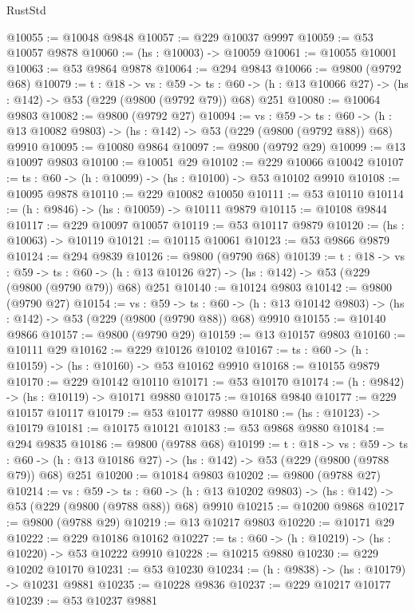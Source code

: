 \begin{lexlean}{RustStd}
\begin{coremodule}
@10055 := @10048 @9848
@10057 := @229 @10037 @9997
@10059 := @53 @10057 @9878
@10060 := (hs : @10003) -> @10059
@10061 := @10055 @10001
@10063 := @53 @9864 @9878
@10064 := @294 @9843
@10066 := @9800 (@9792 @68)
@10079 := {t : @18} ->
  {vs : @59} ->
  {ts : @60} -> (h : @13 @10066 @27) -> (hs : @142) -> @53 (@229 (@9800 (@9792 @79)) @68) @251
@10080 := @10064 @9803
@10082 := @9800 (@9792 @27)
@10094 := {vs : @59} ->
  {ts : @60} -> (h : @13 @10082 @9803) -> (hs : @142) -> @53 (@229 (@9800 (@9792 @88)) @68) @9910
@10095 := @10080 @9864
@10097 := @9800 (@9792 @29)
@10099 := @13 @10097 @9803
@10100 := @10051 @29
@10102 := @229 @10066 @10042
@10107 := {ts : @60} -> (h : @10099) -> (hs : @10100) -> @53 @10102 @9910
@10108 := @10095 @9878
@10110 := @229 @10082 @10050
@10111 := @53 @10110
@10114 := (h : @9846) -> (hs : @10059) -> @10111 @9879
@10115 := @10108 @9844
@10117 := @229 @10097 @10057
@10119 := @53 @10117 @9879
@10120 := (hs : @10063) -> @10119
@10121 := @10115 @10061
@10123 := @53 @9866 @9879
@10124 := @294 @9839
@10126 := @9800 (@9790 @68)
@10139 := {t : @18} ->
  {vs : @59} ->
  {ts : @60} -> (h : @13 @10126 @27) -> (hs : @142) -> @53 (@229 (@9800 (@9790 @79)) @68) @251
@10140 := @10124 @9803
@10142 := @9800 (@9790 @27)
@10154 := {vs : @59} ->
  {ts : @60} -> (h : @13 @10142 @9803) -> (hs : @142) -> @53 (@229 (@9800 (@9790 @88)) @68) @9910
@10155 := @10140 @9866
@10157 := @9800 (@9790 @29)
@10159 := @13 @10157 @9803
@10160 := @10111 @29
@10162 := @229 @10126 @10102
@10167 := {ts : @60} -> (h : @10159) -> (hs : @10160) -> @53 @10162 @9910
@10168 := @10155 @9879
@10170 := @229 @10142 @10110
@10171 := @53 @10170
@10174 := (h : @9842) -> (hs : @10119) -> @10171 @9880
@10175 := @10168 @9840
@10177 := @229 @10157 @10117
@10179 := @53 @10177 @9880
@10180 := (hs : @10123) -> @10179
@10181 := @10175 @10121
@10183 := @53 @9868 @9880
@10184 := @294 @9835
@10186 := @9800 (@9788 @68)
@10199 := {t : @18} ->
  {vs : @59} ->
  {ts : @60} -> (h : @13 @10186 @27) -> (hs : @142) -> @53 (@229 (@9800 (@9788 @79)) @68) @251
@10200 := @10184 @9803
@10202 := @9800 (@9788 @27)
@10214 := {vs : @59} ->
  {ts : @60} -> (h : @13 @10202 @9803) -> (hs : @142) -> @53 (@229 (@9800 (@9788 @88)) @68) @9910
@10215 := @10200 @9868
@10217 := @9800 (@9788 @29)
@10219 := @13 @10217 @9803
@10220 := @10171 @29
@10222 := @229 @10186 @10162
@10227 := {ts : @60} -> (h : @10219) -> (hs : @10220) -> @53 @10222 @9910
@10228 := @10215 @9880
@10230 := @229 @10202 @10170
@10231 := @53 @10230
@10234 := (h : @9838) -> (hs : @10179) -> @10231 @9881
@10235 := @10228 @9836
@10237 := @229 @10217 @10177
@10239 := @53 @10237 @9881

\end{coremodule}
\end{lexlean}
